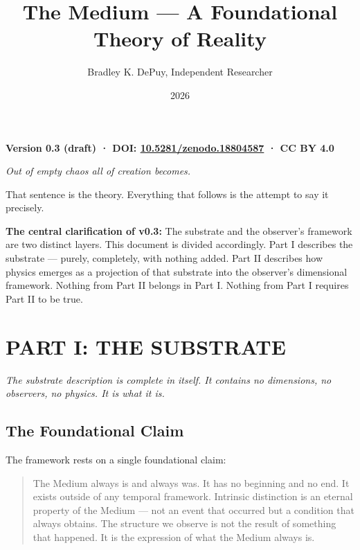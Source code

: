\documentclass[12pt, letterpaper]{article}
\author{Bradley K. DePuy, Independent Researcher}
\date{2026}
\title{The Medium — A Foundational Theory of Reality}
\begin{document}
\maketitle
\tableofcontents

\newpage

\begin{center}
\textbf{Version 0.3 (draft)  ·  DOI: \href{https://doi.org/10.5281/zenodo.18804587}{10.5281/zenodo.18804587}  ·  CC BY 4.0}
\end{center}

\begin{center}
\emph{Out of empty chaos all of creation becomes.}
\end{center}

That sentence is the theory. Everything that follows is the attempt to say it
precisely.

\vspace{1em}
\begin{substratebox}
\textbf{The central clarification of v0.3:} The substrate and the observer's
framework are two distinct layers. This document is divided accordingly.
Part I describes the substrate --- purely, completely, with nothing added.
Part II describes how physics emerges as a projection of that substrate
into the observer's dimensional framework. Nothing from Part II belongs
in Part I. Nothing from Part I requires Part II to be true.
\end{substratebox}
\vspace{1em}
\section{PART I: THE SUBSTRATE}
\label{sec:orgcf73ee5}

\noindent\textit{The substrate description is complete in itself. It contains no dimensions, no observers, no physics. It is what it is.}
\vspace{1em}
\subsection{The Foundational Claim}
\label{sec:orgdbd82ec}

The framework rests on a single foundational claim:

\begin{quote}
The Medium always is and always was. It has no beginning and no end. It exists
outside of any temporal framework. Intrinsic distinction is an eternal property
of the Medium --- not an event that occurred but a condition that always obtains.
The structure we observe is not the result of something that happened. It is the
expression of what the Medium always is.
\end{quote}
\end{document}
